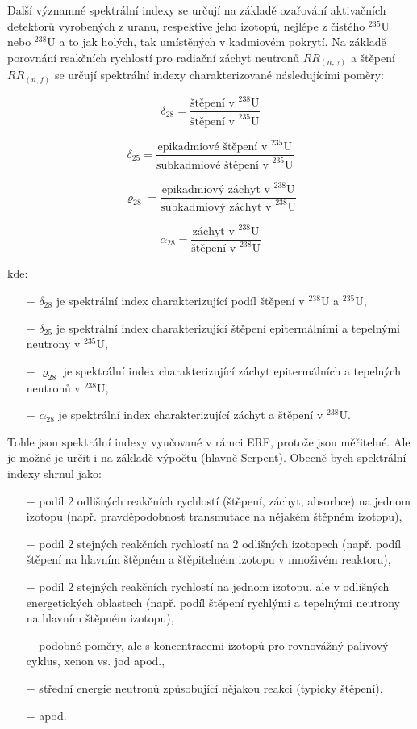 Další významné spektrální indexy se určují na základě ozařování aktivačních detektorů vyrobených z uranu, respektive jeho izotopů, nejlépe z čistého $^{235}\text{U}$ nebo $^{238}\text{U}$ a to jak holých, tak umístěných v kadmiovém pokrytí. Na základě porovnání reakčních rychlostí pro radiační záchyt neutronů $RR_{(n,\gamma)}$ a štěpení $RR_{(n,f)}$ se určují spektrální indexy charakterizované následujícími poměry:

\[
\delta_{28} = \frac{\text{štěpení v } ^{238}\text{U}}{\text{štěpení v } ^{235}\text{U}} 
\]

\[
\delta_{25} = \frac{\text{epikadmiové štěpení v } ^{235}\text{U}}{\text{subkadmiové štěpení v } ^{235}\text{U}}
\]

\[
\varrho_{28} = \frac{\text{epikadmiový záchyt v } ^{238}\text{U}}{\text{subkadmiový záchyt v } ^{238}\text{U}}
\]

\[
\alpha_{28} = \frac{\text{záchyt v } ^{238}\text{U}}{\text{štěpení v } ^{238}\text{U}} 
\]

kde:

\begin{itemize}%
    \item[$-$] $\delta_{28}$ je spektrální index charakterizující podíl štěpení v $^{238}\text{U}$ a $^{235}\text{U}$,
    \item[$-$] $\delta_{25}$ je spektrální index charakterizující štěpení epitermálními a tepelnými neutrony v $^{235}\text{U}$,
    \item[$-$] $\varrho_{28}$ je spektrální index charakterizující záchyt epitermálních a tepelných neutronů v $^{238}\text{U}$,
    \item[$-$] $\alpha_{28}$ je spektrální index charakterizující záchyt a štěpení v $^{238}\text{U}$.
\end{itemize}

Tohle jsou spektrální indexy vyučované v rámci ERF, protože jsou měřitelné. Ale je možné je určit i na základě výpočtu (hlavně Serpent). Obecně bych spektrální indexy shrnul jako:

\begin{itemize}%
    \item[$-$] podíl 2 odlišných reakčních rychlostí (štěpení, záchyt, absorbce) na jednom izotopu (např. pravděpodobnost transmutace na nějakém štěpném izotopu),
    \item[$-$] podíl 2 stejných reakčních rychlostí na 2 odlišných izotopech (např. podíl štěpení na hlavním štěpném a štěpitelném izotopu v množivém reaktoru),
    \item[$-$] podíl 2 stejných reakčních rychlostí na jednom izotopu, ale v odlišných energetických oblastech (např. podíl štěpení rychlými a tepelnými neutrony na hlavním štěpném izotopu),
    \item[$-$] podobné poměry, ale s koncentracemi izotopů pro rovnovážný palivový cyklus, xenon vs. jod apod.,
    \item[$-$] střední energie neutronů způsobující nějakou reakci (typicky štěpení).
    \item[$-$] apod. 
\end{itemize}

